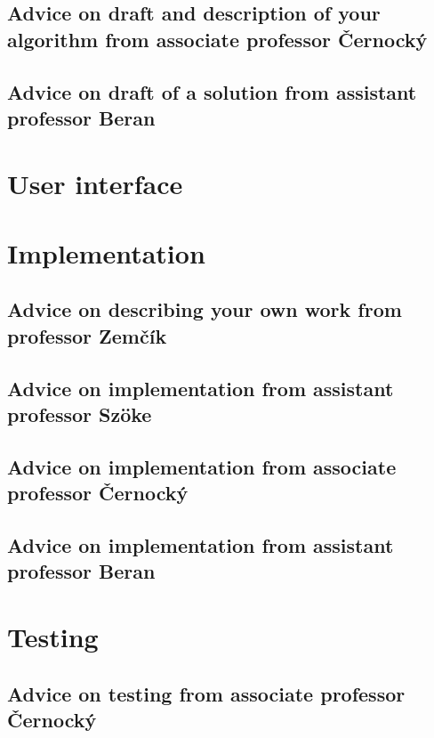 \subsection*{Advice on draft and description of your algorithm from associate professor Černocký}

\subsection*{Advice on draft of a solution from assistant professor Beran}

\section{User interface}

\section{Implementation}
\label{implementace}

\subsection*{Advice on describing your own work from professor Zemčík}

\subsection*{Advice on implementation from assistant professor Szöke}

\subsection*{Advice on implementation from associate professor Černocký}

\subsection*{Advice on implementation from assistant professor Beran}

\section{Testing}
\label{testovani}

\subsection*{Advice on testing from associate professor Černocký}

